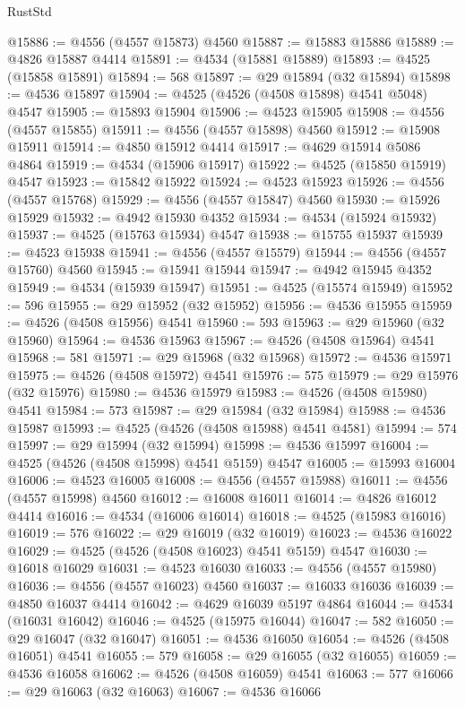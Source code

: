 \begin{lexlean}{RustStd}
\begin{coremodule}
@15886 := @4556 (@4557 @15873) @4560
@15887 := @15883 @15886
@15889 := @4826 @15887 @4414
@15891 := @4534 (@15881 @15889)
@15893 := @4525 (@15858 @15891)
@15894 := 568
@15897 := @29 @15894 (@32 @15894)
@15898 := @4536 @15897
@15904 := @4525 (@4526 (@4508 @15898) @4541 @5048) @4547
@15905 := @15893 @15904
@15906 := @4523 @15905
@15908 := @4556 (@4557 @15855)
@15911 := @4556 (@4557 @15898) @4560
@15912 := @15908 @15911
@15914 := @4850 @15912 @4414
@15917 := @4629 @15914 @5086 @4864
@15919 := @4534 (@15906 @15917)
@15922 := @4525 (@15850 @15919) @4547
@15923 := @15842 @15922
@15924 := @4523 @15923
@15926 := @4556 (@4557 @15768)
@15929 := @4556 (@4557 @15847) @4560
@15930 := @15926 @15929
@15932 := @4942 @15930 @4352
@15934 := @4534 (@15924 @15932)
@15937 := @4525 (@15763 @15934) @4547
@15938 := @15755 @15937
@15939 := @4523 @15938
@15941 := @4556 (@4557 @15579)
@15944 := @4556 (@4557 @15760) @4560
@15945 := @15941 @15944
@15947 := @4942 @15945 @4352
@15949 := @4534 (@15939 @15947)
@15951 := @4525 (@15574 @15949)
@15952 := 596
@15955 := @29 @15952 (@32 @15952)
@15956 := @4536 @15955
@15959 := @4526 (@4508 @15956) @4541
@15960 := 593
@15963 := @29 @15960 (@32 @15960)
@15964 := @4536 @15963
@15967 := @4526 (@4508 @15964) @4541
@15968 := 581
@15971 := @29 @15968 (@32 @15968)
@15972 := @4536 @15971
@15975 := @4526 (@4508 @15972) @4541
@15976 := 575
@15979 := @29 @15976 (@32 @15976)
@15980 := @4536 @15979
@15983 := @4526 (@4508 @15980) @4541
@15984 := 573
@15987 := @29 @15984 (@32 @15984)
@15988 := @4536 @15987
@15993 := @4525 (@4526 (@4508 @15988) @4541 @4581)
@15994 := 574
@15997 := @29 @15994 (@32 @15994)
@15998 := @4536 @15997
@16004 := @4525 (@4526 (@4508 @15998) @4541 @5159) @4547
@16005 := @15993 @16004
@16006 := @4523 @16005
@16008 := @4556 (@4557 @15988)
@16011 := @4556 (@4557 @15998) @4560
@16012 := @16008 @16011
@16014 := @4826 @16012 @4414
@16016 := @4534 (@16006 @16014)
@16018 := @4525 (@15983 @16016)
@16019 := 576
@16022 := @29 @16019 (@32 @16019)
@16023 := @4536 @16022
@16029 := @4525 (@4526 (@4508 @16023) @4541 @5159) @4547
@16030 := @16018 @16029
@16031 := @4523 @16030
@16033 := @4556 (@4557 @15980)
@16036 := @4556 (@4557 @16023) @4560
@16037 := @16033 @16036
@16039 := @4850 @16037 @4414
@16042 := @4629 @16039 @5197 @4864
@16044 := @4534 (@16031 @16042)
@16046 := @4525 (@15975 @16044)
@16047 := 582
@16050 := @29 @16047 (@32 @16047)
@16051 := @4536 @16050
@16054 := @4526 (@4508 @16051) @4541
@16055 := 579
@16058 := @29 @16055 (@32 @16055)
@16059 := @4536 @16058
@16062 := @4526 (@4508 @16059) @4541
@16063 := 577
@16066 := @29 @16063 (@32 @16063)
@16067 := @4536 @16066

\end{coremodule}
\end{lexlean}
